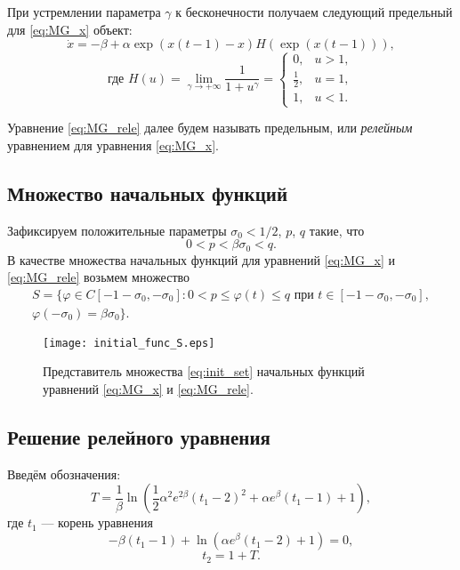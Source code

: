 При устремлении параметра $\gamma$ к бесконечности получаем следующий предельный для \eqref{eq:MG_x} объект:
\begin{equation}
    \label{eq:MG_rele}
    \dot{x}=-\beta + \alpha \exp({x(t-1)-x})H(\exp({x(t-1)})),
\end{equation}
%
\begin{equation}
    \label{eq:H}
    \text{где }
    H(u)=\lim\limits_{\gamma\to +\infty}\frac{1}{1+u^{\gamma}}=
    \begin{cases}
        0, & u > 1,\\
        \frac{1}{2}, & u = 1,\\
        1, & u < 1.
    \end{cases}
\end{equation}

Уравнение \eqref{eq:MG_rele} далее будем называть предельным, или \emph{релейным} уравнением для уравнения \eqref{eq:MG_x}.

\subsection{Множество начальных функций}
Зафиксируем положительные параметры $\sigma_0 < 1/2$, $p$, $q$ такие, что 
%
\[0 < p < \beta \sigma_0 < q.\]
%
В качестве множества начальных функций для уравнений \eqref{eq:MG_x} и \eqref{eq:MG_rele} возьмем множество
\begin{multline}
    \label{eq:init_set}
    S=\{\varphi\in C[-1 - \sigma_0, -\sigma_0]: 0 < p \leqslant \varphi(t)\leqslant q \text{ при } t \in [-1 - \sigma_0, -\sigma_0],\\ \varphi(-\sigma_0) = \beta \sigma_0 \}.
\end{multline}

\begin{figure}
	\centering
	\texttt{[image: initial\_func\_S.eps]}
	\caption{Представитель множества \eqref{eq:init_set} начальных функций уравнений \eqref{eq:MG_x} и \eqref{eq:MG_rele}.}
	\label{fig:initial_funcs:ch1}
\end{figure}

\subsection{Решение релейного уравнения}
Введём обозначения:
\begin{equation}
    \label{eq:T}
    T = \frac{1}{\beta} \ln\left(\frac{1}{2}\alpha^2e^{2\beta}(t_1 - 2)^2 + \alpha e^{\beta}(t_1 - 1) + 1\right),
\end{equation}
где $t_1$ --- корень уравнения 
\begin{equation}
    \label{eq:t1_cond_exp}
    -\beta(t_1 - 1) + \ln(\alpha e^{\beta}(t_1 - 2) + 1) = 0,
\end{equation}
\begin{equation}
    \label{eq:t2_period}
    t_2 = 1 + T.
\end{equation}

